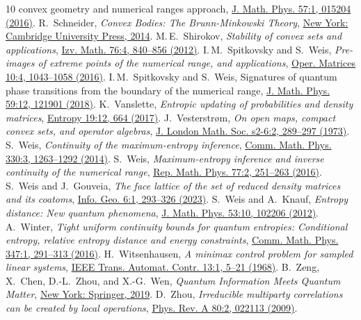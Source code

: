\documentclass[a4paper,11pt,reqno]{amsart}
\theoremstyle{definition}
\theoremstyle{remark}
\numberwithin{equation}{section}
\begin{document}
\begin{thebibliography}{10}
{convex geometry and numerical ranges approach},
\href{https://doi.org/10.1063/1.4926965}%
{J. Math. Phys. 57:1, 015204 (2016)}.
%
R.~Schneider, 
\emph{Convex Bodies: The Brunn-Minkowski Theory}, 
\href{https://doi.org/10.1017/CBO9781139003858}%
{New York: Cambridge University Press, 2014}.
%
M.\,E.~Shirokov, 
\emph{Stability of convex sets and applications},
\href{https://doi.org/10.1070/IM2012v076n04ABEH002606}%
{Izv. Math. 76:4, 840--856 (2012)}.
%
I.\,M.~Spitkovsky and S.~Weis,
\emph{Pre-images of extreme points of the numerical range, and applications},
\href{https://doi.org/10.7153/oam-10-58}%
{Oper. Matrices 10:4, 1043--1058 (2016)}. 
%
I.\,M.~Spitkovsky and S.~Weis, 
{Signatures of quantum phase transitions from the boundary of the numerical range},
\href{https://doi.org/10.1063/1.5017904}%
{J. Math. Phys. 59:12, 121901 (2018)}.
%
K.~Vanslette, 
\emph{Entropic updating of probabilities and density matrices},
\href{https://doi.org/10.3390/e19120664}%
{Entropy 19:12, 664 (2017)}.
%
J.~Vesterstr{\o}m, 
\emph{On open maps, compact convex sets, and operator algebras}, 
\href{https://doi.org/10.1112/jlms/s2-6.2.289}%
{J. London Math. Soc. s2-6:2, 289--297 (1973)}.
%
S.~Weis, 
\emph{Continuity of the maximum-entropy inference},
\href{https://doi.org/10.1007/s00220-014-2090-1}%
{Comm. Math. Phys. 330:3, 1263--1292 (2014)}.
%
S.~Weis, 
\emph{Maximum-entropy inference and inverse continuity of the numerical range},
\href{https://doi.org/10.1016/S0034-4877(16)30022-2}%
{Rep. Math. Phys. 77:2, 251--263 (2016)}.
%
S.~Weis and J.~Gouveia,
\emph{The face lattice of the set of reduced density matrices and its coatoms},
\href{https://doi.org/10.1007/s41884-023-00103-2}%
{Info. Geo. 6:1, 293--326 (2023)}.
%
S.~Weis and A.~Knauf, 
\emph{Entropy distance: New quantum phenomena},
\href{https://doi.org/10.1063/1.4757652}%
{J. Math. Phys. 53:10, 102206 (2012)}.
%
A.~Winter, 
\emph{Tight uniform continuity bounds for quantum entropies: 
Conditional entropy, relative entropy distance and energy constraints},
\href{https://doi.org/10.1007/s00220-016-2609-8}%
{Comm. Math. Phys. 347:1, 291--313 (2016)}. 
%
H.~Witsenhausen, 
\emph{A minimax control problem for sampled linear systems},
\href{https://doi.org/10.1109/TAC.1968.1098788}%
{IEEE Trans. Automat. Contr. 13:1, 5--21 (1968)}.
%
B.~Zeng, X.~Chen, D.-L.~Zhou, and X.-G.~Wen,
\emph{Quantum Information Meets Quantum Matter},
\href{https://doi.org/10.1007/978-1-4939-9084-9}%
{New York: Springer, 2019}.
%
D.~Zhou,
\emph{Irreducible multiparty correlations can be created by local operations},
\href{https://doi.org/10.1103/PhysRevA.80.022113}%
{Phys. Rev. A 80:2, 022113 (2009)}.
%
\end{thebibliography}
\end{document}
